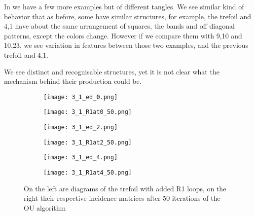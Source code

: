 In  we have a few more examples but of different tangles. We see similar kind of behavior that as before, some have similar structures, for example, the trefoil and 4,1 have about the same arrangement of squares, the bands and off diagonal patterns, except the colors change. However if we compare them with 9,10 and 10,23, we see variation in features between those two examples, and the previous trefoil and 4,1.

We see distinct and recognisable structures, yet it is not clear what the mechanism behind their production could be.

\newpage

\begin{figure}[H]
\centering
\begin{subfigure}[t]{0.48\textwidth}
\centering
\texttt{[image: 3\_1\_ed\_0.png]}
\end{subfigure}
\hfill
\begin{subfigure}[t]{0.48\textwidth}
\centering
\texttt{[image: 3\_1\_R1at0\_50.png]}
\end{subfigure}
\hfill
\begin{subfigure}[t]{0.48\textwidth}
\centering
\texttt{[image: 3\_1\_ed\_2.png]}
\end{subfigure}
\hfill
\begin{subfigure}[t]{0.48\textwidth}
\centering
\texttt{[image: 3\_1\_R1at2\_50.png]}
\end{subfigure}
\hfill
\begin{subfigure}[t]{0.48\textwidth}
\centering
\texttt{[image: 3\_1\_ed\_4.png]}
\end{subfigure}
\hfill
\begin{subfigure}[t]{0.48\textwidth}
\centering
\texttt{[image: 3\_1\_R1at4\_50.png]}
\end{subfigure}
\caption{On the left are diagrams of the trefoil with added R1 loops, on the right their respective incidence matrices after 50 iterations of the OU algorithm}
\label{fig:trefR1examples}
\end{figure}

